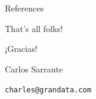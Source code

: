 \documentclass{beamer}
\begin{document}
\begin{frame}{References}
\justifying%


\end{frame}

\begin{frame}{That's all folks!}
\centering
\begin{huge}
¡Gracias!
\end{huge}

\bigskip
\bigskip
\begin{Large}

Carlos Sarraute

\bigskip

\texttt{charles@grandata.com}
\end{Large}

\end{frame}
\end{document}
